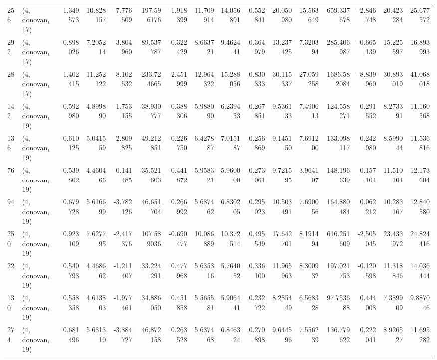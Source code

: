 \begin{tabular}{llrrrrrrrrrrrrrr}
256 &  (4, donovan, 17) &   1.349573 &  10.828157 &  -7.776509 &   197.596176 &  -1.918399 &  11.709914 &  14.056891 &  0.552841 &  20.050980 &  15.563649 &   659.337678 &  -2.846748 &  20.423284 &  25.677572 \\
292 &  (4, donovan, 17) &   0.898026 &   7.205214 &  -3.804960 &    89.537787 &  -0.322429 &   8.663721 &   9.462441 &  0.364979 &  13.237425 &   7.320394 &   285.406987 &  -0.665139 &  15.225597 &  16.893993 \\
28  &  (4, donovan, 17) &   1.402415 &  11.252122 &  -8.102532 &   233.724665 &  -2.451999 &  12.964322 &  15.288056 &  0.830333 &  30.115337 &  27.059258 &  1686.582084 &  -8.839960 &  30.893019 &  41.068018 \\
142 &  (4, donovan, 19) &   0.592980 &   4.899890 &  -1.753155 &    38.930777 &   0.388306 &   5.988090 &   6.239453 &  0.267851 &   9.536133 &   7.490613 &   124.558271 &   0.291552 &   8.273391 &  11.160568 \\
136 &  (4, donovan, 19) &   0.610125 &   5.041559 &  -2.809825 &    49.212851 &   0.226750 &   6.427887 &   7.015187 &  0.256869 &   9.145150 &   7.691200 &   133.098117 &   0.242980 &   8.599044 &  11.536816 \\
76  &  (4, donovan, 19) &   0.539802 &   4.460466 &  -0.141485 &    35.521603 &   0.441872 &   5.958321 &   5.960000 &  0.273061 &   9.721595 &   3.964107 &   148.196639 &   0.157104 &  11.510104 &  12.173604 \\
94  &  (4, donovan, 19) &   0.679728 &   5.616699 &  -3.782126 &    46.651704 &   0.266992 &   5.687462 &   6.830205 &  0.295023 &  10.503491 &   7.690056 &   164.880484 &   0.062212 &  10.283167 &  12.840580 \\
250 &  (4, donovan, 19) &   0.923109 &   7.627795 &  -2.417376 &   107.589036 &  -0.690477 &  10.086889 &  10.372514 &  0.495549 &  17.642701 &   8.191494 &   616.251609 &  -2.505045 &  23.433972 &  24.824416 \\
22  &  (4, donovan, 19) &   0.540793 &   4.468662 &  -1.211407 &    33.224291 &   0.477968 &   5.635316 &   5.764052 &  0.336100 &  11.965963 &   8.300932 &   197.021753 &  -0.120598 &  11.318846 &  14.036444 \\
130 &  (4, donovan, 19) &   0.558358 &   4.613803 &  -1.977461 &    34.886050 &   0.451858 &   5.565581 &   5.906441 &  0.232722 &   8.285449 &   6.568328 &    97.753688 &   0.444008 &   7.389909 &   9.887046 \\
274 &  (4, donovan, 19) &   0.681496 &   5.631310 &  -3.884727 &    46.872158 &   0.263528 &   5.637468 &   6.846324 &  0.270898 &   9.644596 &   7.556239 &   136.779622 &   0.222041 &   8.926527 &  11.695282 \\

\end{tabular}
